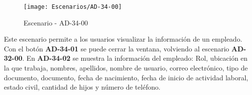 \begin{figure}[H]
\centering
\texttt{[image: Escenarios/AD-34-00]}
\caption{Escenario - AD-34-00}
\label{fig:AD-34-00}
\end{figure}

Este escenario permite a los usuarios visualizar la información de un empleado. Con el botón \textbf{AD-34-01} se puede cerrar la ventana, volviendo al escenario \textbf{AD-32-00}. En \textbf{AD-34-02} se muestra la información del empleado: Rol, ubicación en la que trabaja, nombres, apellidos, nombre de usuario, correo electrónico, tipo de documento, documento, fecha de nacimiento, fecha de inicio de actividad laboral, estado civil, cantidad de hijos y número de teléfono.
\\